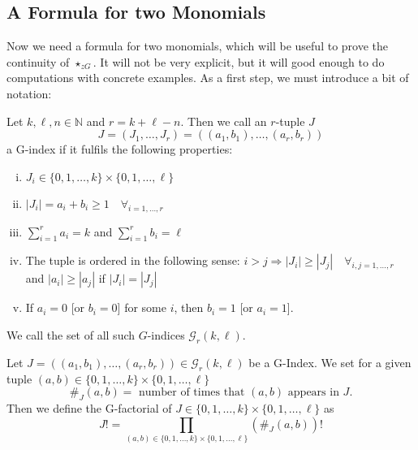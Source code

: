 %

\subsection{A Formula for two Monomials}

Now we need a formula for two monomials, which will be useful to prove 
the continuity of $\star_{zG}$. It will not be very explicit, but it will 
good enough to do computations with concrete examples. As a first step, 
we must introduce a bit of notation:
\begin{definition}[G-Index]
	\label{Def:GuttIndex}
	Let $k, \ell, n \in \mathbb{N}$ and $r = k + \ell - n$. 
	Then we call an $r$-tuple $J$
	\begin{equation*}
		J = (J_1, \ldots, J_r) 
		= 
		((a_1, b_1), \ldots, (a_r, b_r)) 
	\end{equation*}
  	a G-index if it fulfils the following properties:
	\begin{enumerate}[(i)]
		\item
		$J_i \in \{0, 1, \ldots, k\} \times \{0, 1, \ldots, \ell\}$
		
  		\item 
		$|J_i| 
		= 
		a_i + b_i \geq 1 
		\quad \forall_{i = 1, \ldots, r}$
		
		\item 
		$\sum\limits_{i=1}^{r} a_i = k$ 
		and 
		$\sum\limits_{i=1}^{r} b_i = \ell$
		
		\item
		The tuple is ordered in the following sense:
		$i>j \Rightarrow |J_i| \geq |J_j| \quad \forall_{i,j = 1, 
		\ldots, r}$ and $|a_i| \geq |a_j|$ if $|J_i| = |J_j|$
		
		\item 
		If $a_i = 0$ [or $b_i = 0$] for some $i$, 
		then $b_i = 1$ [or $a_i = 1$].
	\end{enumerate}
	We call the set of all such $G$-indices	$\mathcal{G}_r(k,\ell)$.
\end{definition}
\begin{definition}[G-Factorial]
	\label{Def:GuttFactorial}
	Let $J = ((a_1, b_1), \ldots, (a_r, b_r)) \in \mathcal{G}_r(k,
	\ell)$ be a G-Index. We set for a given tuple $(a,b) \in \{0, 1, 
	\ldots, k\} \times \{0, 1, \ldots, \ell\}$
	\begin{equation*}
		\#_J (a,b)
		= 
		\textrm{ number of times that $(a,b)$ appears in } J.
	\end{equation*}
	Then we define the G-factorial of $J \in \{0, 1, \ldots, k\} \times 
	\{0, 1, \ldots, \ell\}$ as
	\begin{equation*}
		J!
		= 
		\prod\limits_{
			(a,b) \in 
			\{0, 1, \ldots, k\} 
			\times 
			\{0, 1, \ldots, \ell\}
		}
		\left( \#_J (a,b) \right)!
	\end{equation*}
\end{definition}
